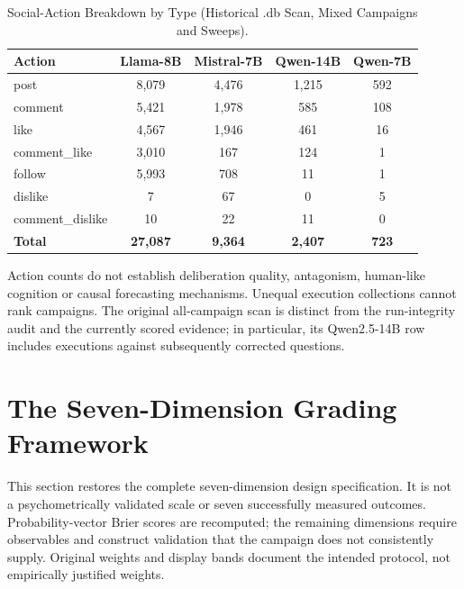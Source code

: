 \begin{table}[!htbp]
\centering
\caption{Social-Action Breakdown by Type (Historical .db Scan, Mixed Campaigns and Sweeps).}
\label{tab:action_breakdown}
\small
\begin{tabular}{lcccc}
\toprule
\textbf{Action} & \textbf{Llama-8B} & \textbf{Mistral-7B} & \textbf{Qwen-14B} & \textbf{Qwen-7B} \\
\midrule
post             & 8,079  & 4,476  & 1,215 & 592 \\
comment          & 5,421  & 1,978  & 585   & 108 \\
like             & 4,567  & 1,946  & 461   & 16  \\
comment\_like    & 3,010  & 167    & 124   & 1   \\
follow           & 5,993  & 708    & 11    & 1   \\
dislike          & 7      & 67     & 0     & 5   \\
comment\_dislike & 10     & 22     & 11    & 0   \\
\midrule
\textbf{Total}   & \textbf{27,087} & \textbf{9,364} & \textbf{2,407} & \textbf{723} \\
\bottomrule
\end{tabular}
\setlength{\tabcolsep}{6pt}
\end{table}

Action counts do not establish deliberation quality, antagonism, human-like cognition or causal forecasting mechanisms. Unequal execution collections cannot rank campaigns. The original all-campaign scan is distinct from the run-integrity audit and the currently scored evidence; in particular, its Qwen2.5-14B row includes executions against subsequently corrected questions.


\section{The Seven-Dimension Grading Framework}
\label{sec:grading}

This section restores the complete seven-dimension design specification. It is not a psychometrically validated scale or seven successfully measured outcomes. Probability-vector Brier scores are recomputed; the remaining dimensions require observables and construct validation that the campaign does not consistently supply. Original weights and display bands document the intended protocol, not empirically justified weights.

